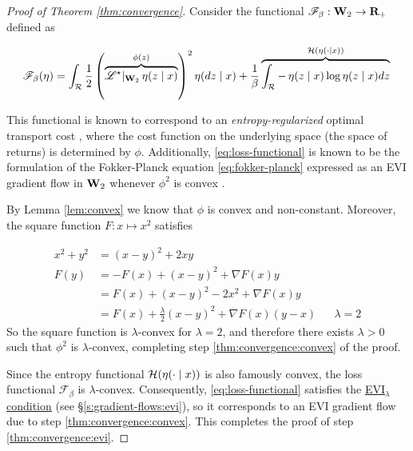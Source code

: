 \begin{proof}[Proof of Theorem \ref{thm:convergence}]
  Consider the functional $\mathscr{F}_\beta:\wasserspace\to\mathbf{R}_+$
  defined as

  \begin{equation}\label{eq:loss-functional}
    \mathscr{F}_\beta(\returnmeasure) =
    \int_{\returnspace}\frac{1}{2}\left(\overbrace{\mathscr{L}^\star\rvert_{\wasserspace}
                                  \returnmeasure(z\mid
                                  x)}^{\phi(z)}\right)^2\returnmeasure(dz\mid x) 
                                  +
                                  \frac{1}{\beta}\overbrace{\int_{\returnspace}-\returnmeasure(z\mid
                                  x)\log\returnmeasure(z\mid
                                        x)dz}^{\mathcal{H}(\returnmeasure(\cdot\mid
    x))}\\
  \end{equation}

  This functional is known to correspond to an
  \emph{entropy-regularized} optimal transport cost
  \citep{cuturi2013sinkhorn}, where the cost function on the underlying space
  (the space of returns) is determined by $\phi$.
  Additionally, \eqref{eq:loss-functional} is known
  \citep{Jordan02thevariational} to be the formulation of the Fokker-Planck
  equation \eqref{eq:fokker-planck} expressed as an EVI gradient flow in
  $\wasserspace[2]$ whenever $\phi^2$ is convex \cite{santambrogio2015optimal}. 

  By Lemma \ref{lem:convex} we know that $\phi$ is convex and
  non-constant. Moreover, the square function $F:x\mapsto x^2$ satisfies

  \begin{align*}
    x^2 + y^2 &= (x - y)^2 + 2xy\\
    F(y) &= -F(x) + (x-y)^2 + \nabla F(x)y\\
              &= F(x) + (x-y)^2 - 2x^2 + \nabla F(x)y\\
    &= F(x) + \frac{\lambda}{2}(x-y)^2 + \nabla F(x)(y - x) && \lambda
                                                               = 2
  \end{align*}
  So the square function is $\lambda$-convex for $\lambda =2$, and
  therefore there exists $\lambda > 0$ such that $\phi^2$ is
  $\lambda$-convex, completing step \ref{thm:convergence:convex} of the proof.

  Since the entropy functional
  $\mathcal{H}(\returnmeasure(\cdot\mid x))$ is also famously convex,
  the loss functional $\mathscr{F}_\beta$ is
  $\lambda$-convex. Consequently, \eqref{eq:loss-functional} satisfies the
  \hyperref[s:gradient-flows:evi]{EVI$_\lambda$ condition} (see
  \S\ref{s:gradient-flows:evi}), so it corresponds to
  an EVI gradient flow due to step \ref{thm:convergence:convex}. This completes the
  proof of step \ref{thm:convergence:evi}.


\end{proof}
